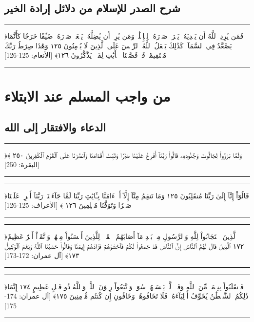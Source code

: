 \documentclass[12pt,openany]{book}
\newenvironment{quranblock}
  {\par\medskip\begin{center}\begin{minipage}{0.92\linewidth}\centering\quranfont\large\color{ink}\hrule\vspace{0.65em}}
  {\vspace{0.65em}\hrule\end{minipage}\end{center}\medskip}
\begin{document}
\section{شرح الصدر للإسلام من دلائل إرادة الخير}
\begin{quranblock}
﴿‌فَمَن ‌يُرِدِ ٱللَّهُ أَن يَهۡدِيَهُۥ يَشۡرَحۡ صَدۡرَهُۥ لِلۡإِسۡلَٰمِۖ وَمَن يُرِدۡ أَن يُضِلَّهُۥ يَجۡعَلۡ صَدۡرَهُۥ ضَيِّقًا حَرَجٗا كَأَنَّمَا يَصَّعَّدُ فِي ٱلسَّمَآءِۚ كَذَٰلِكَ يَجۡعَلُ ٱللَّهُ ٱلرِّجۡسَ عَلَى ٱلَّذِينَ لَا يُؤۡمِنُونَ ١٢٥ وَهَٰذَا صِرَٰطُ رَبِّكَ مُسۡتَقِيمٗاۗ قَدۡ فَصَّلۡنَا ٱلۡأٓيَٰتِ لِقَوۡمٖ يَذَّكَّرُونَ ١٢٦﴾ [الأنعام: 125-126]
\end{quranblock}

\chapter{من واجب المسلم عند الابتلاء}
\section{الدعاء والافتقار إلى الله}
\begin{quranblock}
﴿وَلَمَّا بَرَزُواْ لِجَالُوتَ وَجُنُودِهِۦ قَالُواْ رَبَّنَآ ‌أَفۡرِغۡ عَلَيۡنَا صَبۡرٗا وَثَبِّتۡ أَقۡدَامَنَا وَٱنصُرۡنَا عَلَى ٱلۡقَوۡمِ ٱلۡكَٰفِرِينَ ٢٥٠ ﴾ [البقرة: 250]
\end{quranblock}

\begin{quranblock}
﴿قَالُوٓاْ إِنَّآ إِلَىٰ رَبِّنَا مُنقَلِبُونَ ١٢٥ وَمَا تَنقِمُ مِنَّآ إِلَّآ أَنۡ ءَامَنَّا بِـَٔايَٰتِ رَبِّنَا لَمَّا جَآءَتۡنَاۚ رَبَّنَآ ‌أَفۡرِغۡ عَلَيۡنَا صَبۡرٗا وَتَوَفَّنَا مُسۡلِمِينَ ١٢٦ ﴾ [الأعراف: 125-126]
\end{quranblock}

\begin{quranblock}
﴿ٱلَّذِينَ ٱسۡتَجَابُواْ لِلَّهِ وَٱلرَّسُولِ مِنۢ بَعۡدِ مَآ أَصَابَهُمُ ٱلۡقَرۡحُۚ لِلَّذِينَ أَحۡسَنُواْ مِنۡهُمۡ وَٱتَّقَوۡاْ أَجۡرٌ عَظِيمٌ ١٧٢ ‌ٱلَّذِينَ ‌قَالَ ‌لَهُمُ ٱلنَّاسُ إِنَّ ٱلنَّاسَ قَدۡ جَمَعُواْ لَكُمۡ فَٱخۡشَوۡهُمۡ فَزَادَهُمۡ إِيمَٰنٗا وَقَالُواْ حَسۡبُنَا ٱللَّهُ وَنِعۡمَ ٱلۡوَكِيلُ ١٧٣﴾ [آل عمران: 172-173]
\end{quranblock}

\begin{quranblock}
﴿فَٱنقَلَبُواْ بِنِعۡمَةٖ مِّنَ ٱللَّهِ وَفَضۡلٖ لَّمۡ يَمۡسَسۡهُمۡ سُوٓءٞ وَٱتَّبَعُواْ رِضۡوَٰنَ ٱللَّهِۗ وَٱللَّهُ ذُو فَضۡلٍ عَظِيمٍ ١٧٤ إِنَّمَا ذَٰلِكُمُ ٱلشَّيۡطَٰنُ يُخَوِّفُ أَوۡلِيَآءَهُۥ فَلَا تَخَافُوهُمۡ وَخَافُونِ إِن كُنتُم مُّؤۡمِنِينَ ١٧٥﴾ [آل عمران: 174-175]
\end{quranblock}
\end{document}

